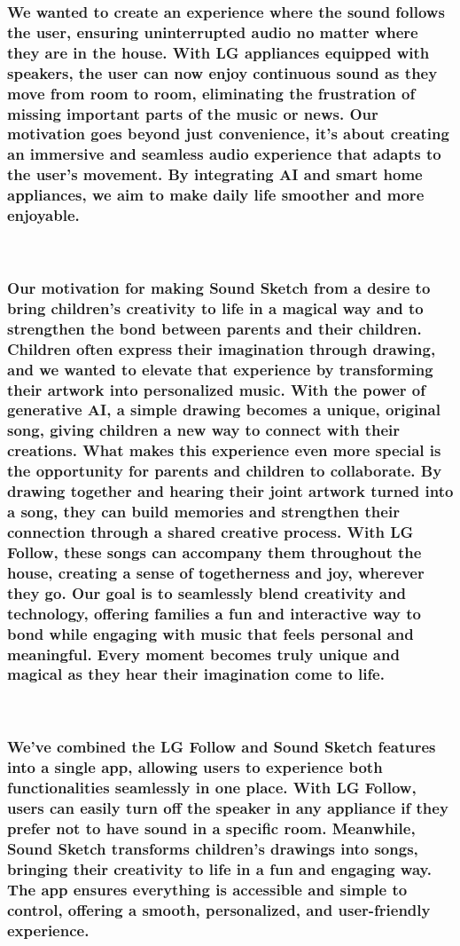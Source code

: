 \documentclass[conference]{IEEEtran}
\begin{document}
\subsubsection{We wanted to create an experience where the sound follows the user, ensuring uninterrupted audio no matter where they are in the house. With LG appliances equipped with speakers, the user can now enjoy continuous sound as they move from room to room, eliminating the frustration of missing important parts of the music or news.
Our motivation goes beyond just convenience, it’s about creating an immersive and seamless audio experience that adapts to the user's movement. By integrating AI and smart home appliances, we aim to make daily life smoother and more enjoyable.}
\

\subsubsection{Our motivation for making Sound Sketch from a desire to bring children's creativity to life in a magical way and to strengthen the bond between parents and their children. Children often express their imagination through drawing, and we wanted to elevate that experience by transforming their artwork into personalized music. With the power of generative AI, a simple drawing becomes a unique, original song, giving children a new way to connect with their creations.
What makes this experience even more special is the opportunity for parents and children to collaborate. By drawing together and hearing their joint artwork turned into a song, they can build memories and strengthen their connection through a shared creative process. With LG Follow, these songs can accompany them throughout the house, creating a sense of togetherness and joy, wherever they go.
Our goal is to seamlessly blend creativity and technology, offering families a fun and interactive way to bond while engaging with music that feels personal and meaningful. Every moment becomes truly unique and magical as they hear their imagination come to life.}


\
\subsubsection{We've combined the LG Follow and Sound Sketch features into a single app, allowing users to experience both functionalities seamlessly in one place. With LG Follow, users can easily turn off the speaker in any appliance if they prefer not to have sound in a specific room. Meanwhile, Sound Sketch transforms children's drawings into songs, bringing their creativity to life in a fun and engaging way. The app ensures everything is accessible and simple to control, offering a smooth, personalized, and user-friendly experience.}
\end{document}
